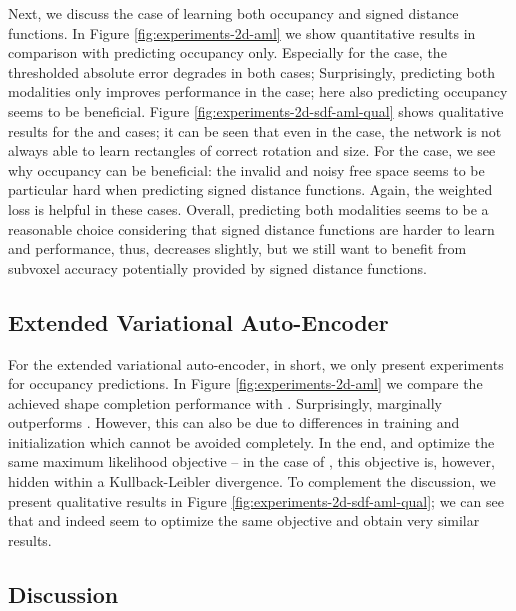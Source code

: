 Next, we discuss the case of learning both occupancy and signed distance functions.
In Figure \ref{fig:experiments-2d-aml} we show quantitative results
in comparison with predicting occupancy only.
Especially for the \easy case,
the thresholded absolute error \AbsThr degrades in both cases; 
Surprisingly, predicting both modalities only improves performance in the
\hard case; here also predicting occupancy seems to be beneficial.
Figure \ref{fig:experiments-2d-sdf-aml-qual}
shows qualitative results for the \easy and \hard cases; it can be seen that even
in the \easy case, the network is not always able to learn rectangles of correct
rotation and size. For the \hard case, we see why occupancy can be beneficial:
the invalid and noisy free space seems to be particular hard when
predicting signed distance functions. Again, the weighted loss is helpful in these cases.
Overall, predicting both modalities seems to be a reasonable choice considering
that signed distance functions are harder to learn and performance, thus,
decreases slightly, but we still want to benefit from subvoxel accuracy potentially
provided by signed distance functions.

\subsection{Extended Variational Auto-Encoder}

For the extended variational auto-encoder, \EVAE in short, we only
present experiments for occupancy predictions. In Figure \ref{fig:experiments-2d-aml}
we compare the achieved shape completion
performance with \AML. Surprisingly,
\EVAE marginally outperforms \AML. However, this can also be due to
differences in training and initialization which cannot be avoided completely.
In the end, \AML and \EVAE optimize the same maximum likelihood objective
-- in the case of \EVAE, this objective is, however, hidden within a
Kullback-Leibler divergence. To complement the discussion,
we present qualitative results in Figure \ref{fig:experiments-2d-sdf-aml-qual};
we can see
that \EVAE and \AML indeed seem to optimize the same objective and obtain
very similar results.

\subsection{Discussion}

